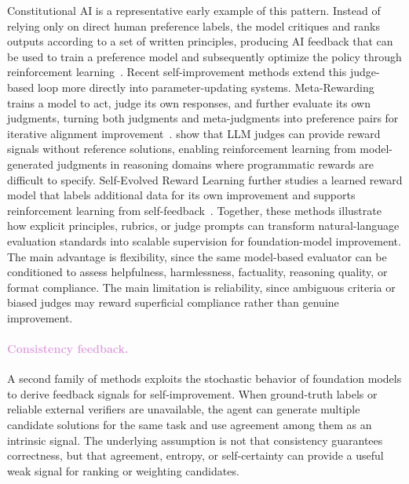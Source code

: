 Constitutional AI is a representative early example of this pattern. Instead of relying only on direct human preference labels, the model critiques and ranks outputs according to a set of written principles, producing AI feedback that can be used to train a preference model and subsequently optimize the policy through reinforcement learning~\citep{bai2022constitutional}. Recent self-improvement methods extend this judge-based loop more directly into parameter-updating systems. Meta-Rewarding trains a model to act, judge its own responses, and further evaluate its own judgments, turning both judgments and meta-judgments into preference pairs for iterative alignment improvement~\citep{wu-etal-2025-meta}. \cite{simonds2025self} show that LLM judges can provide reward signals without reference solutions, enabling reinforcement learning from model-generated judgments in reasoning domains where programmatic rewards are difficult to specify. Self-Evolved Reward Learning further studies a learned reward model that labels additional data for its own improvement and supports reinforcement learning from self-feedback~\citep{huang2025selfevolved}. Together, these methods illustrate how explicit principles, rubrics, or judge prompts can transform natural-language evaluation standards into scalable supervision for foundation-model improvement. The main advantage is flexibility, since the same model-based evaluator can be conditioned to assess helpfulness, harmlessness, factuality, reasoning quality, or format compliance. The main limitation is reliability, since ambiguous criteria or biased judges may reward superficial compliance rather than genuine improvement.

\paragraph{\textcolor{Plum}{Consistency feedback.}}
A second family of methods exploits the stochastic behavior of foundation models to derive feedback signals for self-improvement.
When ground-truth labels or reliable external verifiers are unavailable, the agent can generate multiple candidate solutions for the same task and use agreement among them as an intrinsic signal. The underlying assumption is not that consistency guarantees correctness, but that agreement, entropy, or self-certainty can provide a useful weak signal for ranking or weighting candidates.

